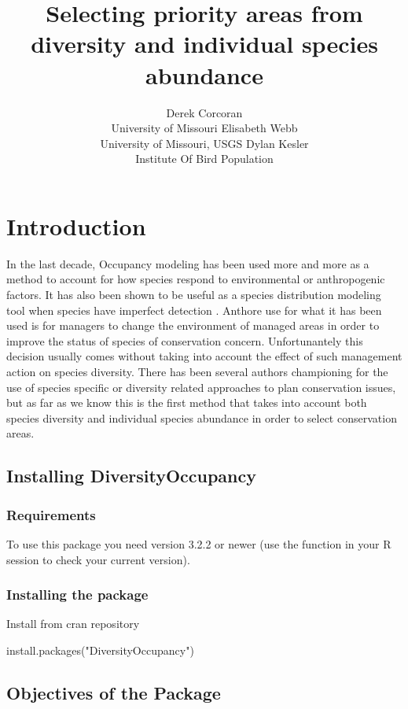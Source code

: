 \documentclass[article]{jss}
\author{
Derek Corcoran\\University of Missouri \And Elisabeth Webb\\University of Missouri, USGS \And Dylan Kesler\\Institute Of Bird Population
}
\title{Selecting priority areas from diversity and individual species abundance
\pkg{DiversityOccupancy}}
\begin{document}
\section{Introduction}\label{introduction}

In the last decade, Occupancy modeling has been used more and more as a
method to account for how species respond to environmental or
anthropogenic factors. It has also been shown to be useful as a species
distribution modeling tool when species have imperfect detection
\cite{mackenzie_estimating_2002}. Anthore use for what it has been used
is for managers to change the environment of managed areas in order to
improve the status of species of conservation concern. Unfortunantely
this decision usually comes without taking into account the effect of
such management action on species diversity. There has been several
authors championing for the use of species specific or diversity related
approaches to plan conservation issues, but as far as we know this is
the first method that takes into account both species diversity and
individual species abundance in order to select conservation areas.

\subsection{Installing
DiversityOccupancy}\label{installing-diversityoccupancy}

\subsubsection{Requirements}\label{requirements}

To use this package you need  version 3.2.2 or newer (use
the function  in your R session to check your
current version).

\subsubsection{Installing the package}\label{installing-the-package}

Install from cran repository

\begin{CodeChunk}
\begin{CodeInput}
install.packages("DiversityOccupancy")
\end{CodeInput}
\end{CodeChunk}

\subsection{Objectives of the Package}\label{objectives-of-the-package}
\end{document}
